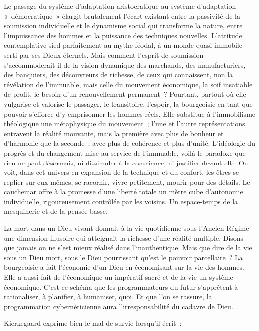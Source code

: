 \documentclass[french,twoside]{book} %
\begin{document}
Le passage du système d’adaptation aristocratique au système d’adaptation « démocratique » élargit brutalement l’écart existant entre la passivité de la soumission individuelle et le dynamisme social qui transforme la nature, entre l’impuissance des hommes et la puissance des techniques nouvelles. L’attitude contemplative sied parfaitement au mythe féodal, à un monde quasi immobile serti par ses Dieux éternels. Mais comment l’esprit de soumission s’accommoderait-il de la vision dynamique des marchands, des manufacturiers, des banquiers, des découvreurs de richesse, de ceux qui connaissent, non la révélation de l’immuable, mais celle du mouvement économique, la soif insatiable de profit, le besoin d’un renouvellement permanent ? Pourtant, partout où elle vulgarise et valorise le passager, le transitoire, l’espoir, la bourgeoisie en tant que pouvoir s’efforce d’y emprisonner les hommes réels. Elle substitue à l’immobilisme théologique une métaphysique du mouvement ; l’une et l’autre représentations entravent la réalité mouvante, mais la première avec plus de bonheur et d’harmonie que la seconde ; avec plus de cohérence et plus d’unité. L’idéologie du progrès et du changement mise au service de l’immuable, voilà le paradoxe que rien ne peut désormais, ni dissimuler à la conscience, ni justifier devant elle. On voit, dans cet univers en expansion de la technique et du confort, les êtres se replier sur eux-mêmes, se racornir, vivre petitement, mourir pour des détails. Le cauchemar offre à la promesse d’une liberté totale un mètre cube d’autonomie individuelle, rigoureusement contrôlée par les voisins. Un espace-temps de la mesquinerie et de la pensée basse.\par
La mort dans un Dieu vivant donnait à la vie quotidienne sous l’Ancien Régime une dimension illusoire qui atteignait la richesse d’une réalité multiple. Disons que jamais on ne s’est mieux réalisé dans l’inauthentique. Mais que dire de la vie sous un Dieu mort, sous le Dieu pourrissant qu’est le pouvoir parcellaire ? La bourgeoisie a fait l’économie d’un Dieu en économisant sur la vie des hommes. Elle a aussi fait de l’économique un impératif sacré et de la vie un système économique. C’est ce schéma que les programmateurs du futur s’apprêtent à rationaliser, à planifier, à humaniser, quoi. Et que l’on se rassure, la programmation cybernéticienne aura l’irresponsabilité du cadavre de Dieu.\par
Kierkegaard exprime bien le mal de survie lorsqu’il écrit :\par
\end{document}
